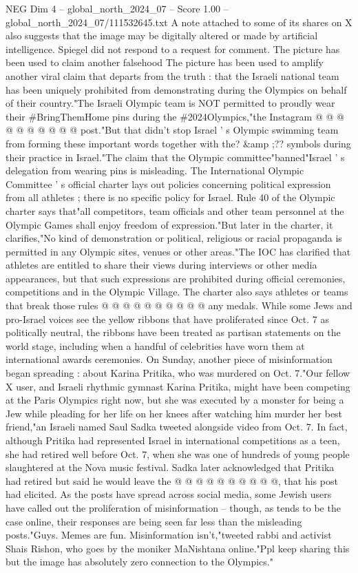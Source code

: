 \begin{textsample}{NEG Dim 4 – global\_north\_2024\_07 – Score 1.00 – global\_north\_2024\_07/111532645.txt}
A note attached to some of its shares on X also suggests that the image may be digitally altered or made by artificial intelligence.
Spiegel did not respond to a request for comment.
The picture has been used to claim another falsehood The picture has been used to amplify another viral claim that departs from the truth : that the Israeli national team has been uniquely prohibited from demonstrating during the Olympics on behalf of their country."The Israeli Olympic team is NOT permitted to proudly wear their \#BringThemHome pins during the \#2024Olympics,"the Instagram @ @ @ @ @ @ @ @ @ @ post."But that didn't stop Israel ' s Olympic swimming team from forming these important words together with the? \&amp ;?? symbols during their practice in Israel."The claim that the Olympic committee"banned"Israel ' s delegation from wearing pins is misleading.
The International Olympic Committee ' s official charter lays out policies concerning political expression from all athletes ; there is no specific policy for Israel.
Rule 40 of the Olympic charter says that"all competitors, team officials and other team personnel at the Olympic Games shall enjoy freedom of expression."But later in the charter, it clarifies,"No kind of demonstration or political, religious or racial propaganda is permitted in any Olympic sites, venues or other areas."The IOC has clarified that athletes are entitled to share their views during interviews or other media appearances, but that such expressions are prohibited during official ceremonies, competitions and in the Olympic Village.
The charter also says athletes or teams that break those rules @ @ @ @ @ @ @ @ @ @ any medals.
While some Jews and pro-Israel voices see the yellow ribbons that have proliferated since Oct. 7 as politically neutral, the ribbons have been treated as partisan statements on the world stage, including when a handful of celebrities have worn them at international awards ceremonies.
On Sunday, another piece of misinformation began spreading : about Karina Pritika, who was murdered on Oct. 7."Our fellow X user, and Israeli rhythmic gymnast Karina Pritika, might have been competing at the Paris Olympics right now, but she was executed by a monster for being a Jew while pleading for her life on her knees after watching him murder her best friend,"an Israeli named Saul Sadka tweeted alongside video from Oct. 7.
In fact, although Pritika had represented Israel in international competitions as a teen, she had retired well before Oct. 7, when she was one of hundreds of young people slaughtered at the Nova music festival.
Sadka later acknowledged that Pritika had retired but said he would leave the @ @ @ @ @ @ @ @ @ @, that his post had elicited.
As the posts have spread across social media, some Jewish users have called out the proliferation of misinformation -- though, as tends to be the case online, their responses are being seen far less than the misleading posts."Guys.
Memes are fun.
Misinformation isn't,"tweeted rabbi and activist Shais Rishon, who goes by the moniker MaNishtana online."Ppl keep sharing this but the image has absolutely zero connection to the Olympics."

\end{textsample}
